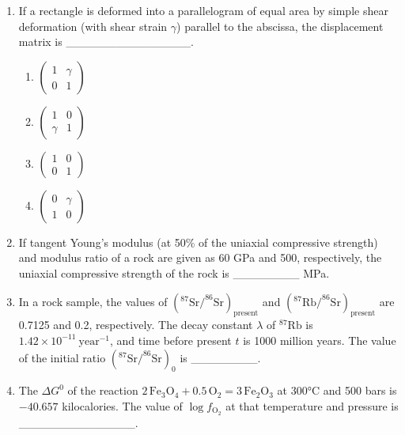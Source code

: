 \documentclass[journal,12pt,onecolumn]{IEEEtran}
\begin{document}
\begin{enumerate}
\begin{enumerate}
\item If a rectangle is deformed into a parallelogram of equal area by simple shear deformation (with shear strain $\gamma$) parallel to the abscissa, the displacement matrix is _______________.

\hfill{}

\begin{multicols}{1}
\begin{enumerate}
\item $\begin{pmatrix}1 & \gamma \\ 0 & 1\end{pmatrix}$
\item $\begin{pmatrix}1 & 0 \\ \gamma & 1\end{pmatrix}$
\item $\begin{pmatrix}1 & 0 \\ 0 & 1\end{pmatrix}$
\item $\begin{pmatrix}0 & \gamma \\ 1 & 0\end{pmatrix}$
\end{enumerate}
\end{multicols}

\item If tangent Young's modulus (at 50\% of the uniaxial compressive strength) and modulus ratio of a rock are given as 60 GPa and 500, respectively, the uniaxial compressive strength of the rock is ________ MPa.

\hfill{}


\item In a rock sample, the values of $(^{87}\mathrm{Sr}/^{86}\mathrm{Sr})_{\text{present}}$ and $(^{87}\mathrm{Rb}/^{86}\mathrm{Sr})_{\text{present}}$ are 0.7125 and 0.2, respectively. The decay constant $\lambda$ of $^{87}\mathrm{Rb}$ is $1.42\times10^{-11}\ \text{year}^{-1}$, and time before present $t$ is 1000 million years. The value of the initial ratio $(^{87}\mathrm{Sr}/^{86}\mathrm{Sr})_0$ is ________.

\hfill{}


\item The $\Delta G^0$ of the reaction $2\,\mathrm{Fe_3O_4} + 0.5\,\mathrm{O_2} = 3\,\mathrm{Fe_2O_3}$ at 300°C and 500 bars is $-40.657$ kilocalories. The value of $\log f_{\mathrm{O}_2}$ at that temperature and pressure is ______________.


\end{enumerate}
\end{enumerate}
\end{document}
